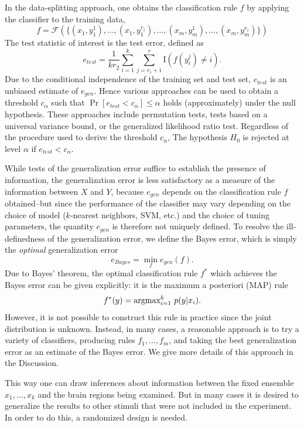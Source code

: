 \documentclass[12pt]{article}
\begin{document}
In the data-splitting approach, one obtains the classification rule $f$ by applying the classifier to the training data,
\[
f = \mathcal{F}(\{(x_1, y_1^1),\hdots, (x_1,y_1^{r_1}), \hdots, (x_m, y_m^1),\hdots, (x_m,y_m^{r_1})\})
\]
The test statistic of interest is the test error,
defined as
\[
e_{test} = \frac{1}{k r_2} \sum_{i=1}^k \sum_{j = r_1 + 1}^r \text{I}(f(y_i^j) \neq i).
\]
Due to the conditional independence of the training set and test set,
$e_{test}$ is an unbiased estimate of $e_{gen}$.  Hence various
approaches can be used to obtain a threshold $c_\alpha$ such that
$\Pr[e_{test} < c_\alpha] \leq \alpha$ holds (approximately) under the
null hypothesis.  These approaches include permutation tests,
tests based on a universal variance bound, or the generalized
likelihood ratio test.  Regardless of the procedure used to derive the
threshold $c_\alpha$, The hypothesis $H_0$ is rejected at level
$\alpha$ if $e_{test} < c_\alpha$.

While tests of the generalization error suffice to establish the
presence of information, the generalization error is less satisfactory
as a measure of the information between $X$ and $Y$, because
$e_{gen}$ depends on the classification rule $f$ obtained--but since the performance of the classifier
may vary depending on the choice of model ($k$-nearest neighbors, SVM, etc.) and the choice of tuning parameters,
the quantity $e_{gen}$ is therefore not uniquely defined.
To resolve the ill-definedness of the generalization error, we define
the Bayes error, which is simply the \emph{optimal}
generalization error
\[
e_{Bayes} = \min_f e_{gen}(f).
\]
Due to Bayes' theorem, the optimal classification rule $f^*$ which
achieves the Bayes error can be given explicitly: it is the maximum a
posteriori (MAP) rule
\[
f^*(y) = \text{argmax}_{i=1}^k\ p(y|x_i).
\]
However, it is not possible to construct this rule in practice since
the joint distribution is unknown.  Instead, in many cases, a
reasonable approach is to try a variety of classifiers, producing
rules $f_1,\hdots, f_m$, and taking the best generalization error as
an estimate of the Bayes error.  We give more details of this approach
in the Discussion.

This way one can draw inferences about information between the fixed
ensemble $x_1,...,x_k$ and the brain regions being examined.  But in
many cases it is desired to generalize the results to other stimuli
that were not included in the experiment.  In order to do this, a
randomized design is needed.
\end{document}

